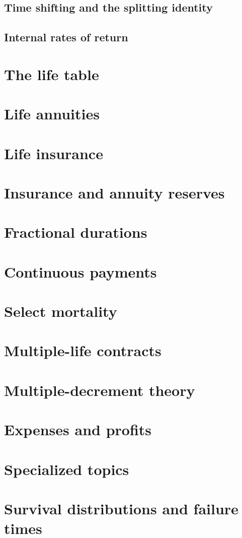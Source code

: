 \documentclass{article}
\begin{document}
\subsection{Time shifting and the splitting identity}
\subsection{Internal rates of return}
\section{The life table}
\section{Life annuities}
\section{Life insurance}
\section{Insurance and annuity reserves}
\section{Fractional durations}
\section{Continuous payments}
\section{Select mortality}
\section{Multiple-life contracts}
\section{Multiple-decrement theory}
\section{Expenses and profits}
\section{Specialized topics}
\section{Survival distributions and failure times}
\end{document}
